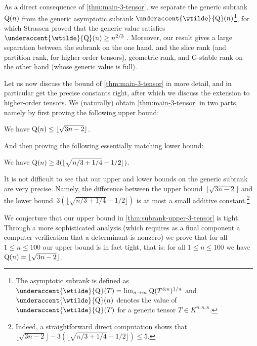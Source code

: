 \documentclass[11pt]{article}
\theoremstyle{definition}
\theoremstyle{remark}
\newcommand{\subrank}{{\rm Q}}
\newcommand{\gensubrank}{{\rm Q}}
\DeclareMathOperator{\asympsubrank}{\underaccent{\wtilde}{Q}}
\begin{document}
As a direct consequence of \autoref{thm:main-3-tensor}, we separate the generic subrank~$\gensubrank(n)$ from the generic asymptotic subrank $\asympsubrank(n)$\footnote{The asymptotic subrank is defined as $\asympsubrank(T) = \lim_{n\to\infty} \subrank(T^{\otimes n})^{1/n}$ and $\asympsubrank(n)$ denotes the value of $\asympsubrank(T)$ for a generic tensor $T \in K^{n,n,n}$.}, for which Strassen proved that the generic value satisfies~$\asympsubrank(n) \geq n^{2/3}$ \cite[Prop.~3.6]{strassen1988asymptotic}. Moreover, our result gives a large separation between the subrank on the one hand, and the slice rank (and partition rank, for higher order tensors), geometric rank, and G-stable rank on the other hand (whose generic value is full).

Let us now discuss the bound of \autoref{thm:main-3-tensor} in more detail, and in particular get the precise constants right, after which we discuss the extension to higher-order tensors.
We (naturally) obtain \autoref{thm:main-3-tensor} in two parts, namely by first proving the following upper bound:

\begin{theorem} \label{thm:subrank-upper-3-tensor}
%
We have 
$\gensubrank(n) \leq \lfloor\sqrt{3n-2}\rfloor$.
\end{theorem}

And then proving the following essentially matching lower bound:

\begin{theorem}\label{thm:subrank-lower-3-tensor}
We have $\gensubrank(n) \geq 3(\lfloor\sqrt{n/3 + 1/4}-1/2\rfloor)$.
\end{theorem}

%
It is not difficult to see that our upper and lower bounds on the generic subrank are very precise. Namely, 
the difference between the upper bound~$\lfloor\sqrt{3n-2}\rfloor$ %
and the lower bound~$3(\lfloor\sqrt{n/3 + 1/4}-1/2\rfloor)$ %
is at most a small additive constant.\footnote{Indeed, a straightforward direct computation shows that  $\lfloor\sqrt{3n-2}\rfloor - 3(\lfloor\sqrt{n/3 + 1/4}-1/2\rfloor) \leq 5$.}

We conjecture that our upper bound in \autoref{thm:subrank-upper-3-tensor} is tight.
Through a more sophisticated analysis (which requires as a final component a computer verification that a determinant is nonzero) we prove that for all $1\leq n \leq 100$ our upper bound is in fact tight, that is: for all $1 \leq n \leq 100$ we have $\gensubrank(n) = \lfloor\sqrt{3n-2}\rfloor$. %
\end{document}
